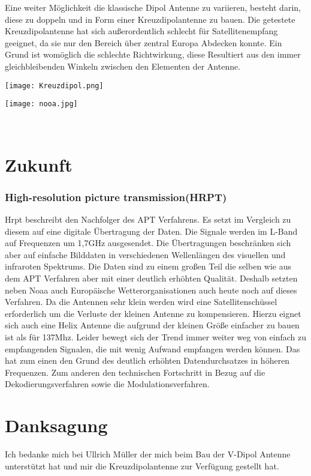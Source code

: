 \begin{multicols*}{2}
    Eine weiter Möglichkeit die klassische Dipol Antenne zu variieren, besteht darin, diese zu doppeln und in Form einer Kreuzdipolantenne zu bauen. Die getestete Kreuzdipolantenne hat sich außerordentlich schlecht für Satellitenempfang geeignet, da sie nur den Bereich über zentral Europa Abdecken konnte. Ein Grund ist womöglich die schlechte Richtwirkung, diese Resultiert aus den immer gleichbleibenden Winkeln zwischen den Elementen der Antenne. 

\end{multicols*}


\begin{center}
    \centering
    \texttt{[image: Kreuzdipol.png]}
\end{center}

\begin{center}
    \centering
    \texttt{[image: nooa.jpg]}
\end{center}
\

\part{Zukunft}
\section[]{High-resolution picture transmission(HRPT)}

Hrpt beschreibt den Nachfolger des APT Verfahrens. Es setzt im Vergleich zu diesem auf eine digitale Übertragung der Daten. Die Signale werden im L-Band auf Frequenzen um 1,7GHz ausgesendet. Die Übertragungen beschränken sich aber auf einfache Bilddaten in verschiedenen Wellenlängen des visuellen und infraroten Spektrums. Die Daten sind zu einem großen Teil die selben wie aus dem APT Verfahren aber mit einer deutlich erhöhten Qualität. Deshalb setzten neben Noaa auch Europäische Wetterorganisationen auch heute noch auf dieses Verfahren. Da die Antennen sehr klein werden wird eine Satellitenschüssel erforderlich um die Verluste der kleinen Antenne zu kompensieren. Hierzu eignet sich auch eine Helix Antenne die aufgrund der kleinen Größe einfacher zu bauen ist als für 137Mhz. Leider bewegt sich der Trend immer weiter weg von einfach zu empfangenden Signalen, die mit wenig Aufwand empfangen werden können. Das hat zum einen den Grund des deutlich erhöhten Datendurchsatzes in höheren Frequenzen. Zum anderen den technischen Fortschritt in Bezug auf die Dekodierungsverfahren sowie die Modulationsverfahren.  


\part*{Danksagung}

Ich bedanke mich bei Ullrich Müller der mich beim Bau der V-Dipol Antenne unterstützt hat und mir die Kreuzdipolantenne zur Verfügung gestellt hat.